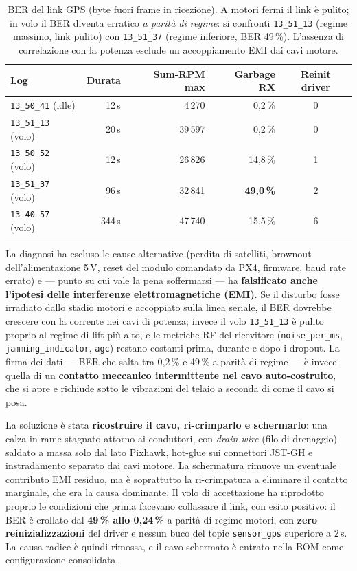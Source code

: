 \begin{table}[H]
\centering
\caption{BER del link GPS (byte fuori frame in ricezione). A motori fermi il link
\`e pulito; in volo il BER diventa erratico \emph{a parit\`a di regime}: si
confronti \texttt{13\_51\_13} (regime massimo, link pulito) con \texttt{13\_51\_37}
(regime inferiore, BER 49\,\%). L'assenza di correlazione con la potenza esclude
un accoppiamento EMI dai cavi motore.}
\label{tab:ber}
\small
\begin{tabularx}{\linewidth}{@{}l r r r c@{}}
\toprule
\textbf{Log} & \textbf{Durata} & \textbf{Sum-RPM max} & \textbf{Garbage RX} & \textbf{Reinit driver} \\
\midrule
\texttt{13\_50\_41} (idle) & 12\,s & 4\,270 & 0{,}2\,\% & 0 \\
\texttt{13\_51\_13} (volo) & 20\,s & 39\,597 & 0{,}2\,\% & 0 \\
\texttt{13\_50\_52} (volo) & 12\,s & 26\,826 & 14{,}8\,\% & 1 \\
\texttt{13\_51\_37} (volo) & 96\,s & 32\,841 & \textbf{49{,}0\,\%} & 2 \\
\texttt{13\_40\_57} (volo) & 344\,s & 47\,740 & 15{,}5\,\% & 6 \\
\bottomrule
\end{tabularx}
\end{table}

La diagnosi ha escluso le cause alternative (perdita di satelliti, brownout
dell'alimentazione 5\,V, reset del modulo comandato da PX4, firmware, baud rate
errato) e --- punto su cui vale la pena soffermarsi --- ha \textbf{falsificato
anche l'ipotesi delle interferenze elettromagnetiche (EMI)}. Se il disturbo fosse
irradiato dallo stadio motori e accoppiato sulla linea seriale, il BER dovrebbe
crescere con la corrente nei cavi di potenza; invece il volo \texttt{13\_51\_13}
\`e pulito proprio al regime di lift pi\`u alto, e le metriche RF del ricevitore
(\texttt{noise\_per\_ms}, \texttt{jamming\_indicator}, \texttt{agc}) restano
costanti prima, durante e dopo i dropout. La firma dei dati --- BER che salta tra
0{,}2\,\% e 49\,\% a parit\`a di regime --- \`e invece quella di un
\textbf{contatto meccanico intermittente nel cavo auto-costruito}, che si apre e
richiude sotto le vibrazioni del telaio a seconda di come il cavo si posa.

La soluzione \`e stata \textbf{ricostruire il cavo, ri-crimparlo e schermarlo}:
una calza in rame stagnato attorno ai conduttori, con \emph{drain wire} (filo di
drenaggio) saldato a massa solo dal lato Pixhawk, hot-glue sui connettori JST-GH e
instradamento separato dai cavi motore. La schermatura rimuove un eventuale
contributo EMI residuo, ma \`e soprattutto la ri-crimpatura a eliminare il
contatto marginale, che era la causa dominante. Il volo di accettazione ha
riprodotto proprio le condizioni che prima facevano collassare il link, con esito
positivo: il BER \`e crollato dal \textbf{49\,\% allo 0{,}24\,\%} a parit\`a di
regime motori, con \textbf{zero reinizializzazioni} del driver e nessun buco del
topic \texttt{sensor\_gps} superiore a 2\,s. La causa radice \`e quindi rimossa, e
il cavo schermato \`e entrato nella BOM come configurazione consolidata.

